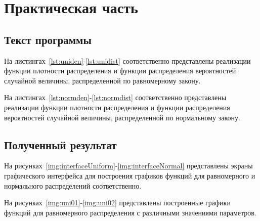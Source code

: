 \chapter{Практическая часть}

\section{Текст программы}

На листингах~\ref{lst:uniden}-\ref{lst:unidist} соответственно представлены
реализации функции плотности распределения и функции распределения вероятностей
случайной величины, распределенной по равномерному закону.

{
\captionsetup{format=hang,justification=raggedright,
              singlelinecheck=off,width=16cm}

}

На листингах~\ref{lst:normden}-\ref{lst:normdist} соответственно представлены
реализации функции плотности распределения и функции распределения вероятностей
случайной величины, распределенной по нормальному закону.

{
\captionsetup{format=hang,justification=raggedright,
              singlelinecheck=off,width=16cm}

}

\section{Полученный результат}

На рисунках~\ref{img:interfaceUniform}-\ref{img:interfaceNormal} представлены
экраны графического интерфейса для построения графиков функций для равномерного
и нормального распределений соответственно.



\clearpage
На рисунках~\ref{img:uni01}-\ref{img:uni02} представлены построенные графики
функций для равномерного распределения с различными значениями параметров.

